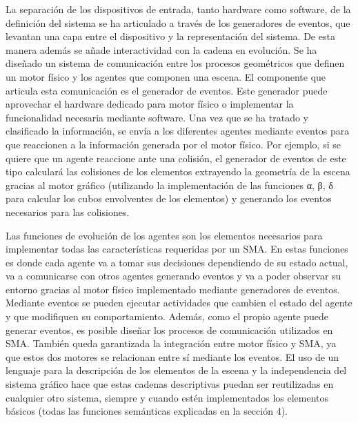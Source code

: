 \documentclass[runningheads]{llncs}
\begin{document}
La separación de los dispositivos de entrada, tanto hardware como software, de la definición del sistema se ha articulado a través de los generadores de eventos, que levantan una capa entre el dispositivo y la representación del sistema. De esta manera además se añade interactividad con la cadena en evolución.
Se ha diseñado un sistema de comunicación entre los procesos geométricos que definen un motor físico y los agentes que componen una escena. El componente que articula esta comunicación es el generador de eventos. Este generador puede aprovechar el hardware dedicado para motor físico o implementar la funcionalidad necesaria mediante software. Una vez que se ha tratado y clasificado la información, se envía a los diferentes agentes mediante eventos para que reaccionen a la información generada por el motor físico. Por ejemplo, si se quiere que un agente reaccione ante una colisión, el generador de eventos de este tipo calculará las colisiones de los elementos extrayendo la geometría de la escena gracias al motor gráfico (utilizando la implementación de las funciones α, β, δ para calcular los cubos envolventes de los elementos) y generando los eventos necesarios para las colisiones.

	Las funciones de evolución de los agentes son los elementos necesarios para implementar todas las características requeridas por un SMA. En estas funciones es donde cada agente va a tomar sus decisiones dependiendo de su estado actual, va a comunicarse con otros agentes generando eventos y va a poder observar su entorno gracias al motor físico implementado mediante generadores de eventos. Mediante eventos se pueden ejecutar actividades que cambien el estado del agente y que modifiquen su comportamiento. Además, como el propio agente puede generar eventos, es posible diseñar los procesos de comunicación utilizados en SMA. También queda garantizada la integración entre motor físico y SMA, ya que estos dos motores se relacionan entre sí mediante los eventos.
El uso de un lenguaje para la descripción de los elementos de la escena y la independencia del sistema gráfico hace que estas cadenas descriptivas puedan ser reutilizadas en cualquier otro sistema, siempre y cuando estén implementados los elementos básicos (todas las funciones semánticas explicadas en la sección 4).
\end{document}
